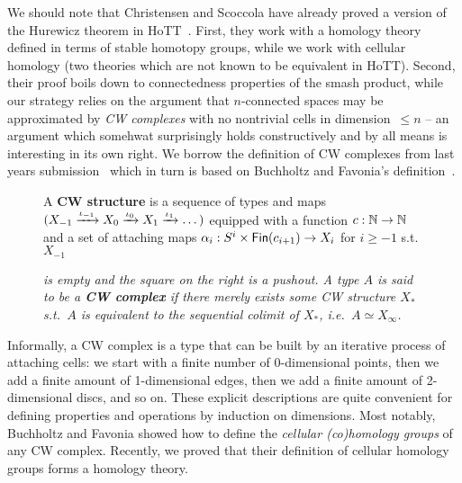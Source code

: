 \documentclass[a4page]{article}
\begin{document}
We should note that Christensen and Scoccola have already proved a version of the Hurewicz
theorem in HoTT~\cite{christensen2020hurewicz}.
%
First, they work with a homology theory defined in terms of stable
homotopy groups, while we work with cellular homology (two theories
which are not known to be equivalent in HoTT).
%
Second, their proof boils down to connectedness properties of the
smash product, while our strategy relies on the argument that \( n
\)-connected spaces may be approximated by \emph{CW complexes} with no
nontrivial cells in dimension~\( \le n \) -- an argument which
somehwat surprisingly holds constructively and by all means is interesting in its own right.
%
We borrow the definition of CW complexes from last years
submission~\cite{HoTTUF} which in turn is based on Buchholtz and
Favonia's definition~\cite{BuchholtzFavonia18}.
\begin{figure}[H]
\begin{minipage}{0.68 \linewidth}
\begin{definition}
  A \textbf{CW structure} is a sequence of types and maps
  $(X_{-1} \xrightarrow{\textnormal{\ensuremath{\iota_{-1}}}} X_0 \xrightarrow{\textnormal{\ensuremath{\iota_{0}}}} X_1 \xrightarrow{\textnormal{\ensuremath{\iota_{1}}}} \dots )$
  equipped with a function $c : \mathbb{N} \to \mathbb{N}$ and a set of attaching maps $\alpha_i : S^i \times \textnormal{\ensuremath{\mathsf{Fin}({c_{i+1}})}} \to X_i$ for $i \geq -1$ s.t. $X_{-1}$
\end{definition}
\end{minipage}
\vspace{-.1cm}
\hspace{.1cm}
\begin{minipage}{0.32 \linewidth}
\end{minipage}
\emph{is empty and the square on the right is a pushout.
  A type $A$ is said to be a \textbf{CW complex} if there merely exists some
  CW structure $X_\ast$ s.t.\ $A$ is equivalent to the sequential colimit
  of $X_\ast$, i.e.\ $A \simeq X_\infty$.}
\end{figure}
%
Informally, a CW complex is a type that can be built by an iterative process of attaching
cells: we start with a finite number of 0-dimensional points, then we add a finite
amount of 1-dimensional edges, then we add a finite amount of 2-dimensional discs, and so on.
%
These explicit descriptions are quite convenient for defining properties and operations by
induction on dimensions. Most notably, Buchholtz and Favonia showed how to define the
\emph{cellular (co)homology groups} of any CW complex.
%
Recently, we proved that their definition of cellular homology groups forms a homology theory.
\end{document}
